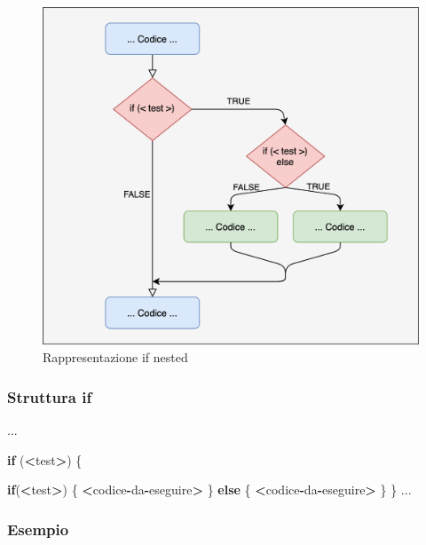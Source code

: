 \documentclass[
]{book}
\newenvironment{Shaded}{\begin{snugshade}}{\end{snugshade}}
\newcommand{\ControlFlowTok}[1]{\textcolor[rgb]{0.13,0.29,0.53}{\textbf{#1}}}
\newcommand{\NormalTok}[1]{#1}
\newcommand{\OperatorTok}[1]{\textcolor[rgb]{0.81,0.36,0.00}{\textbf{#1}}}
\newcommand{\StringTok}[1]{\textcolor[rgb]{0.31,0.60,0.02}{#1}}
\begin{document}
\begin{figure}

{\centering \includegraphics[width=0.65\linewidth]{images/ifnested} 

}

\caption{Rappresentazione if nested}\label{fig:plot-ifnested}
\end{figure}

\hypertarget{struttura-if-2}{%
\subsubsection*{Struttura if}\label{struttura-if-2}}

\begin{Shaded}
\begin{Highlighting}[]
\NormalTok{  ...}
  
  \ControlFlowTok{if}\NormalTok{ (}\OperatorTok{<}\NormalTok{test}\OperatorTok{>}\NormalTok{) \{}
    
    \ControlFlowTok{if}\NormalTok{(}\OperatorTok{<}\NormalTok{test}\OperatorTok{>}\NormalTok{) \{}
      \OperatorTok{<}\NormalTok{codice}\OperatorTok{-}\NormalTok{da}\OperatorTok{-}\NormalTok{eseguire}\OperatorTok{>}
\StringTok{    }\NormalTok{\} }\ControlFlowTok{else}\NormalTok{ \{}
      \OperatorTok{<}\NormalTok{codice}\OperatorTok{-}\NormalTok{da}\OperatorTok{-}\NormalTok{eseguire}\OperatorTok{>}
\StringTok{    }\NormalTok{\}}
\NormalTok{  \}}
\NormalTok{  ...}
\end{Highlighting}
\end{Shaded}

\hypertarget{esempio-2}{%
\subsubsection*{Esempio}\label{esempio-2}}
\end{document}

